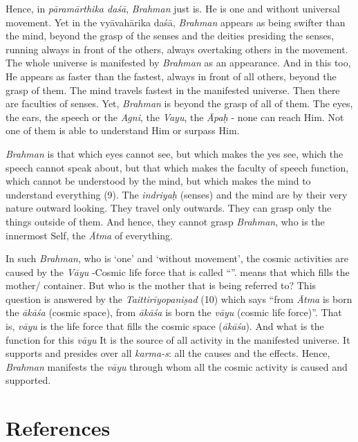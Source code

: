 Hence, in \emph{pāramārthika daśā}, \emph{Brahman} just is. He is one and without universal movement. Yet in the vyāvahārika daśā, \emph{Brahman} appears as being swifter than the mind, beyond the grasp of the senses and the deities presiding the senses, running always in front of the others, always overtaking others in the movement. The whole universe is manifested by \emph{Brahman} as an appearance. And in this too, He appears as faster than the fastest, always in front of all others, beyond the grasp of them. The mind travels fastest in the manifested universe. Then there are faculties of senses. Yet, \emph{Brahman} is beyond the grasp of all of them. The eyes, the ears, the speech or the \emph{Agni}, the \emph{Vayu}, the \emph{Āpaḥ} - none can reach Him. Not one of them is able to understand Him or surpass Him.

\emph{Brahman} is that which eyes cannot see, but which makes the yes see, which the speech cannot speak about, but that which makes the faculty of speech function, which cannot be understood by the mind, but which makes the mind to understand everything (9). The \emph{indriyaḥ} (senses) and the mind are by their very nature outward looking. They travel only outwards. They can grasp only the things outside of them. And hence, they cannot grasp \emph{Brahman}, who is the innermost Self, the \emph{Ātma} of everything.

In such \emph{Brahman}, who is `one' and `without movement', the cosmic activities are caused by the \emph{Vāyu} -Cosmic life force that is called ``''.  means that which fills the mother/ container. But who is the mother that is being referred to? This question is answered by the \emph{Taittirīyopaniṣad} (10) which says ``from \emph{Ātma} is born the \emph{ākāśa} (cosmic space), from \emph{ākāśa} is born the \emph{vāyu} (cosmic life force)''. That is, \emph{vāyu} is the life force that fills the cosmic space (\emph{ākāśa}). And what is the function for this \emph{vāyu} It is the source of all activity in the manifested universe. It supports and presides over all \emph{karma-s}: all the causes and the effects. Hence, \emph{Brahman} manifests the \emph{vāyu} through whom all the cosmic activity is caused and supported.

\section*{References}

